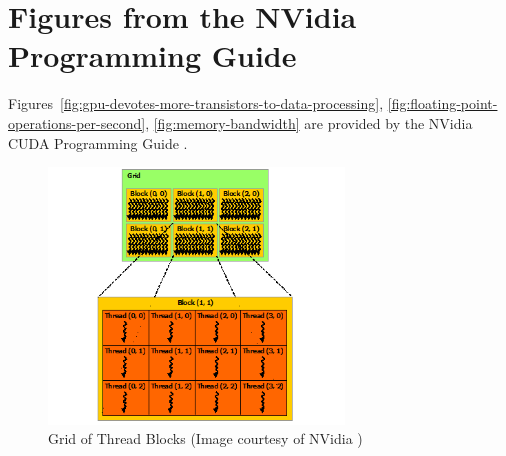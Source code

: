 \chapter{Figures from the NVidia Programming Guide}

Figures~\ref{fig:gpu-devotes-more-transistors-to-data-processing}, \ref{fig:floating-point-operations-per-second}, \ref{fig:memory-bandwidth} are provided by the NVidia CUDA Programming Guide \cite{CudaGuide2013}. 


\begin{figure}
\centering
\includegraphics[width=0.7\textwidth]{gpu_content/nvidia_figures/grid-of-thread-blocks.png}
\caption{Grid of Thread Blocks (Image courtesy of NVidia \cite{CudaGuide2013})} 
\label{fig:grid-of-thread-blocks}
\end{figure}
